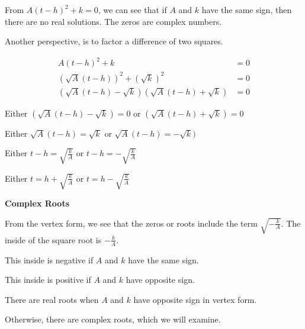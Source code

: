 \documentclass{ximera}
\begin{document}
\begin{itemize}
From $A (t - h)^2 + k  = 0$, we can see that if $A$ and $k$ have the same sign, then there are no real solutions.  The zeros are complex numbers.




Another perspective, is to factor a difference of two squares.




\begin{align*}
A (t - h)^2 + k    & = 0  \\
(\sqrt{A} (t - h))^2 + (\sqrt{k})^2       & = 0 \\
(\sqrt{A} (t - h) - \sqrt{k}) (\sqrt{A} (t - h) + \sqrt{k})         & = 0  
\end{align*}

Either $(\sqrt{A} (t - h) - \sqrt{k}) = 0$  or  $(\sqrt{A} (t - h) + \sqrt{k}) = 0$

Either $\sqrt{A} (t - h) = \sqrt{k}$  or  $\sqrt{A} (t - h) = -\sqrt{k})$


Either $t - h = \sqrt{\frac{k}{A}}$  or  $t - h = -\sqrt{\frac{k}{A}}$ 


Either $t  = h + \sqrt{\frac{k}{A}}$  or  $t = h - \sqrt{\frac{k}{A}}$ 






\end{itemize}



\begin{observation} \textbf{\textcolor{-red!75}{Complex Roots}}



From the vertex form, we see that the zeros or roots include the term $\sqrt{-\frac{k}{A}}$.  The inside of the square root is $-\frac{k}{A}$.  

This inside is negative if $A$ and $k$ have the same sign. 


This inside is positive if $A$ and $k$ have opposite sign. 

There are real roots when $A$ and $k$ have opposite sign in vertex form. 

Otherwise, there are complex roots, which we will examine.

\end{observation}
\end{document}
